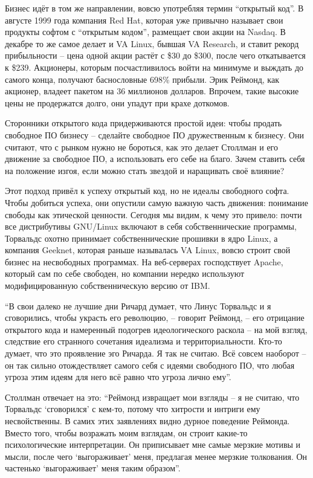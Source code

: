 Бизнес идёт в том же направлении, вовсю употребляя термин ``открытый код''. В августе 1999 года компания Red Hat, которая уже привычно называет свои продукты софтом с ``открытым кодом'', размещает свои акции на Nasdaq. В декабре то же самое делает и VA Linux, бывшая VA Research, и ставит рекорд прибыльности -- цена одной акции растёт с \$30 до \$300, после чего откатывается к \$239. Акционеры, которым посчастливилось войти на минимуме и выждать до самого конца, получают баснословные 698\% прибыли. Эрик Реймонд, как акционер, владеет пакетом на 36 миллионов долларов. Впрочем, такие высокие цены не продержатся долго, они упадут при крахе доткомов.

Сторонники открытого кода придерживаются простой идеи: чтобы продать свободное ПО бизнесу -- сделайте свободное ПО дружественным к бизнесу. Они считают, что с рынком нужно не бороться, как это делает Столлман и его движение за свободное ПО, а использовать его себе на благо. Зачем ставить себя на положение изгоя, если можно стать звездой и наращивать своё влияние?

Этот подход привёл к успеху открытый код, но не идеалы свободного софта. Чтобы добиться успеха, они опустили самую важную часть движения: понимание свободы как этической ценности. Сегодня мы видим, к чему это привело: почти все дистрибутивы GNU/Linux включают в себя собственнические программы, Торвальдс охотно принимает собственнические прошивки в ядро Linux, а компания Geeknet, которая раньше называлась VA Linux, вовсю строит свой бизнес на несвободных программах. На веб-серверах господствует Apache, который сам по себе свободен, но компании нередко используют модифицированную собственническую версию от IBM.

``В свои далеко не лучшие дни Ричард думает, что Линус Торвальдс и я сговорились, чтобы украсть его революцию, -- говорит Реймонд, -- его отрицание открытого кода и намеренный подогрев идеологического раскола -- на мой взгляд, следствие его странного сочетания идеализма и территориальности. Кто-то думает, что это проявление эго Ричарда. Я так не считаю. Всё совсем наоборот -- он так сильно отождествляет самого себя с идеями свободного ПО, что любая угроза этим идеям для него всё равно что угроза лично ему''.

Столлман отвечает на это: ``Реймонд извращает мои взгляды -- я не считаю, что Торвальдс `сговорился' с кем-то, потому что хитрости и интриги ему несвойственны. В самих этих заявлениях видно дурное поведение Реймонда. Вместо того, чтобы возражать моим взглядам, он строит какие-то психологические интерпретации. Он приписывает мне самые мерзкие мотивы и мысли, после чего `выгораживает' меня, предлагая менее мерзкие толкования. Он частенько `выгораживает' меня таким образом''.

